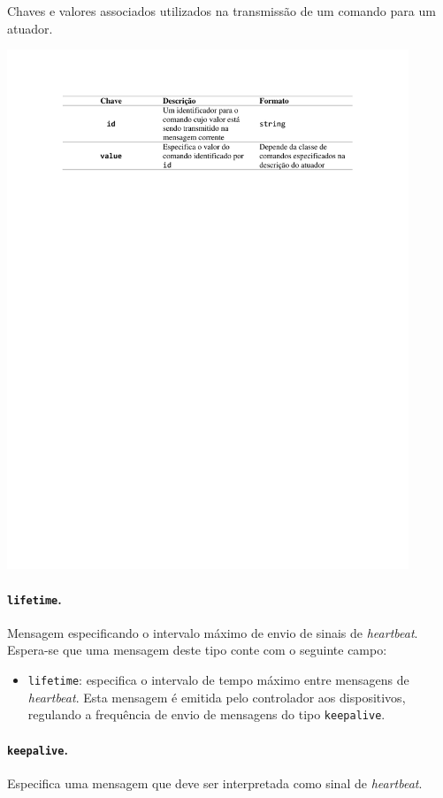 \begin{table}[h]
	\centering
	\caption{Chaves e valores associados utilizados na transmissão de um comando para um atuador.}\smallskip
	\label{tab:chaves_comando}
	\includegraphics[width=0.9\textwidth]{tabelas/chaves_comando.pdf}
\end{table}

\paragraph*{\texttt{lifetime}.} Mensagem especificando o intervalo máximo de envio de sinais de  \textit{heartbeat}. Espera-se que uma mensagem deste tipo conte com o seguinte campo:
\begin{itemize}
	\item \texttt{lifetime}: especifica o intervalo de tempo máximo entre mensagens de \textit{heartbeat}. Esta mensagem é emitida pelo controlador aos dispositivos, regulando a frequência de envio de mensagens do tipo \texttt{keepalive}.
\end{itemize}

\paragraph*{\texttt{keepalive}.} Especifica uma mensagem que deve ser interpretada como sinal de  \textit{heartbeat}.

